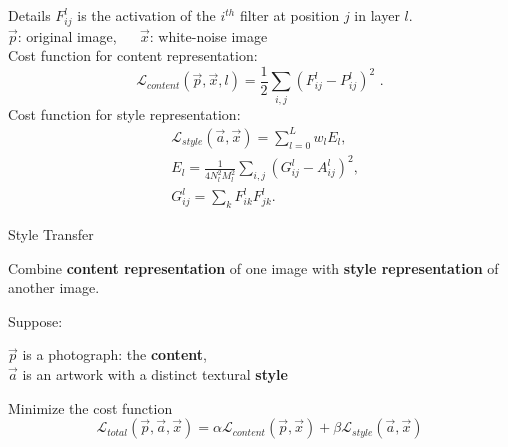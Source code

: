 \documentclass[12pt,t]{beamer}
\begin{document}
\begin{frame}{Details}
$F_{ij}^l$ is the activation of the $i^{th}$ filter at position $j$ in layer $l$. \\
$\vec{p}$: original image, ~~ $\vec{x}$: white-noise image \\
Cost function for content representation: 
\begin{equation*}
\mathcal{L}_{content}(\vec{p},\vec{x},l) = \frac{1}{2}\sum_{i,j}\left(F^l_{ij} - P^l_{ij}\right)^2 \text{ .}
\end{equation*}
Cost function for style representation: 
\begin{equation*}
\begin{split}
& \mathcal{L}_{style}(\vec{a},\vec{x}) = \sum_{l=0}^{L}w_{l}E_l, \\
& E_l = \frac{1}{4 N_l^2 M_l^2}\sum_{i,j}\left(G^l_{ij}-A^l_{ij}\right)^2, \\
& G_{ij}^l = \sum_k F_{ik}^l F_{jk}^l.
\end{split}
\end{equation*}

\end{frame}

\begin{frame}{Style Transfer}

Combine {\bf content representation} of one image with {\bf style representation} of another image.

\bigskip 

Suppose: 

\hspace{1cm} $\vec{p}$ is a photograph: the {\bf content}, \\
\hspace{1cm} $\vec{a}$ is an artwork with a distinct textural {\bf style}\\

\bigskip 

Minimize the cost function 
\begin{equation*}
\mathcal{L}_{total}(\vec{p},\vec{a},\vec{x}) = \alpha  \mathcal{L}_{content}(\vec{p},\vec{x}) + \beta \mathcal{L}_{style}(\vec{a},\vec{x})
\end{equation*}


\end{frame}
\end{document}
